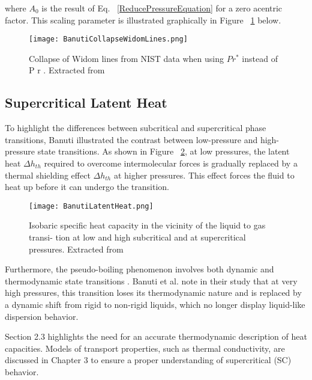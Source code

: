 		where $A_0$ is the result of Eq. ~\ref{ReducePressureEquation} for a
		zero acentric factor. This scaling parameter is illustrated graphically
		in Figure ~\ref{BanutiCollapseWidomLines} below.

		\begin{figure}[h!]
			\centering
			\texttt{[image: BanutiCollapseWidomLines.png]}
			\caption{Collapse of Widom lines from NIST
			\cite{burgess2012thermochemical} data when using $Pr^*$ instead of P
			r . Extracted from \cite{banuti2017similarity}}
		\label{BanutiCollapseWidomLines}
		\end{figure}

	\subsection{Supercritical Latent Heat}

	To highlight the differences between subcritical and supercritical phase
	transitions, Banuti \cite{banuti2015crossing} illustrated the contrast
	between low-pressure and high-pressure state transitions. As shown in Figure
	~\ref{BanutiLatentHeat}, at low pressures, the latent heat $\Delta h_{th}$
	required to overcome intermolecular forces is gradually replaced by a
	thermal shielding effect $\Delta h_{th}$ at higher pressures. This effect
	forces the fluid to heat up before it can undergo the transition.

	\begin{figure}[h!]
		\centering
		\texttt{[image: BanutiLatentHeat.png]}
		\caption{Isobaric specific heat capacity in the vicinity of the liquid
		to gas transi- tion at low and high subcritical and at supercritical
		pressures. Extracted from \cite{banuti2019latent}}
	\label{BanutiLatentHeat}
	\end{figure}

	Furthermore, the pseudo-boiling phenomenon involves both dynamic and
	thermodynamic state transitions \cite{banuti2020between,banuti2019latent}.
	Banuti et al. note in their study that at very high pressures, this
	transition loses its thermodynamic nature and is replaced by a dynamic shift
	from rigid to non-rigid liquids, which no longer display liquid-like
	dispersion behavior.

	Section 2.3 highlights the need for an accurate thermodynamic description of
	heat capacities. Models of transport properties, such as thermal conductivity,
	are discussed in Chapter 3 to ensure a proper understanding of supercritical
	(SC) behavior.

